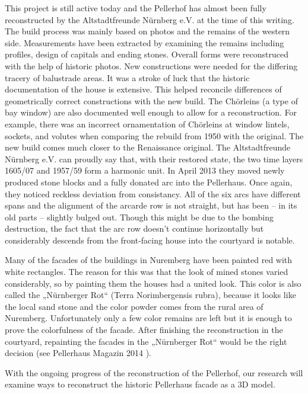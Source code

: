 This project is still active today and the Pellerhof has almost been fully reconstructed by the Altstadtfreunde Nürnberg e.V. at the time of this writing. The build process was mainly based on photos and the remains of the western side. Measurements have been extracted by examining the remains including profiles, design of capitals and ending stones. Overall forms were reconstruced with the help of historic photos. New constructions were needed for the differing tracery of balustrade areas. It was a stroke of luck that the historic documentation of the house is extensive. This helped reconcile differences of geometrically correct constructions with the new build. The Chörleins (a type of bay window) are also documented well enough to allow for a reconstruction. For example, there was an incorrect ornamentation of Chörleins at window lintels, sockets, and volutes when comparing the rebuild from 1950 with the original. The new build comes much closer to the Renaissance original. The Altstadtfreunde Nürnberg e.V. can proudly say that, with their restored state, the two time layers 1605/07 and 1957/59 form a harmonic unit. In April 2013 they moved newly produced stone blocks and a fully donated arc into the Pellerhaus. Once again, they noticed reckless deviation from consistancy. All of the six arcs have different spans and the alignment of the arcarde row is not straight, but has been – in its old parts – slightly bulged out. Though this might be due to the bombing destruction, the fact that the arc row doesn't continue horizontally but considerably descends from the front-facing house into the courtyard is notable.

Many of the facades of the buildings in Nuremberg have been painted red with white rectangles. The reason for this was that the look of mined stones varied considerably, so by painting them the houses had a united look. This color is also called the „Nürnberger Rot“ (Terra Norimbergensis rubra), because it looks like the local sand stone and the color powder comes from the rural area of Nuremberg. Unfortunately only a few color remains are left but it is enough to prove the colorfulness of the facade. After finishing the reconstruction in the courtyard, repainting the facades in the „Nürnberger Rot“ would be the right decision (see Pellerhaus Magazin 2014 \parencite{afPellerhausMagazin03}).

With the ongoing progress of the reconstruction of the Pellerhof, our research will examine ways to reconstruct the historic Pellerhaus facade as a 3D model.\\

